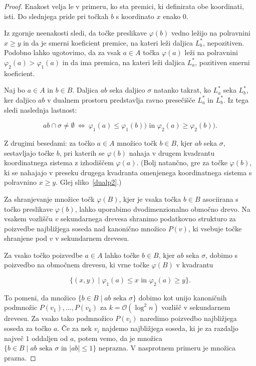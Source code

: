 \documentclass[a4paper, 12pt]{book}
\newcommand{\OO}{\ensuremath{\mathcal{O}}} %
\begin{document}
\begin{proof}
Enakost velja le v primeru, ko sta premici, ki definirata obe koordinati, isti. Do slednjega pride pri točkah $b$ s koordinato $x$ enako $0$. 

Iz zgornje neenakosti sledi, da točke preslikave $\varphi(b)$ vedno ležijo na polravnini $x \geq y$ in da je smerni koeficient premice, na kateri leži daljica $L^*_b$, nepozitiven. Podobno lahko ugotovimo, da za vsak $a \in A$ točka $\varphi(a)$ leži na polravnini $\varphi_2(a) > \varphi_1(a)$ in da ima premica, na kateri leži daljica $L^*_a$, pozitiven smerni koeficient.

Naj bo $a \in A$ in $b \in B$. Daljica $ab$ seka daljico $\sigma$ natanko takrat, ko $L^*_a$ seka $L^*_b$, ker daljico $ab$ v dualnem prostoru predstavlja ravno presečišče $L^*_a$ in $L^*_b$. Iz tega sledi naslednja lastnost:

	\[
		ab \cap \sigma \neq \emptyset ~\Longleftrightarrow ~ 
		\varphi_1(a)\le \varphi_1(b)) \text{ in } \varphi_2(a)\ge \varphi_2(b)).
	\]	
	
Z drugimi besedami: za točko $a \in A$ množico točk $b \in B$, kjer $ab$ seka $\sigma$, sestavljajo točke $b$, pri katerih se $\varphi(b)$ nahaja v drugem kvadrantu koordinatnega sistema z izhodiščem $\varphi(a)$. (Bolj natančno, gre za točke $\varphi(b)$, ki se nahajajo v preseku drugega kvadranta omenjenega koordinatnega sistema s polravnino $x \geq y$. Glej sliko~\ref{dualp2}.)

Za shranjevanje množice točk $\varphi(B)$, kjer je vsaka točka $b \in B$ asociirana s točko preslikave $\varphi(b)$, lahko uporabimo dvodimenzionalno območno drevo. Na vsakem vozlišču $v$ sekundarnega drevesa shranimo podatkovno strukturo za poizvedbe najbližjega soseda nad kanonično množico $P(v)$, ki vsebuje točke shranjene pod $v$ v sekundarnem drevesu. 

Za vsako točko poizvedbe $a \in A$ lahko točke $b \in B$, kjer $ab$ seka $\sigma$, dobimo s poizvedbo na območnem drevesu, ki vrne točke $\varphi(B)$ v kvadrantu

\[
		\{(x,y)\mid  \varphi_1(a) \leq x \text{ in } \varphi_2(a) \geq y\}.
	\]

To pomeni, da množico $\{ b\in B \mid \text{$ab$ seka $\sigma$}\}$ dobimo kot unijo kanoničnih podmnožic $P(v_1),...,P(v_k)$ za $k = \OO(\log^2n)$ vozlišč v sekundarnem drevesu. Za vsako tako podmnožico $P(v_i)$ naredimo poizvedbo najbližjega soseda za točko $a$. Če za nek $v_i$ najdemo najbližjega soseda, ki je za razdaljo največ $1$ oddaljen od $a$, potem vemo, da je množica $\{ b\in B \mid \text{$ab$ seka $\sigma$ in $|ab|\le 1$}\}$ neprazna. V nasprotnem primeru je množica prazna.


\end{proof}
\end{document}
